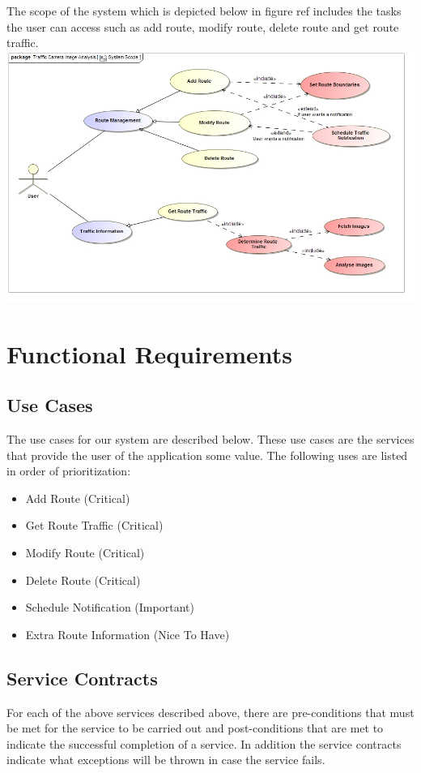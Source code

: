 \documentclass[a4paper,12pt]{article}
\begin{document}
The scope of the system which is depicted below in {figure ref} includes the tasks the user can access such as add route, modify route, delete route and get route traffic.
\includegraphics[width=\textwidth]{images/System_Scope.jpg}

\section{Functional Requirements}
\subsection{Use Cases}
The use cases for our system are described below. These use cases are the services that provide the user of the application some value. The following uses are listed in order of prioritization:
\begin{itemize}
\item Add Route 			(Critical)
\item Get Route Traffic		(Critical)
\item Modify Route			(Critical)
\item Delete Route			(Critical)
\item Schedule Notification (Important)
\item Extra Route Information 	(Nice To Have)
\end{itemize}
\subsection{Service Contracts}
For each of the above services described above, there are pre-conditions that must be met for the service to be carried out and post-conditions that are met to indicate the successful completion of a service. In addition the service contracts indicate what exceptions will be thrown in case the service fails.
\end{document}
